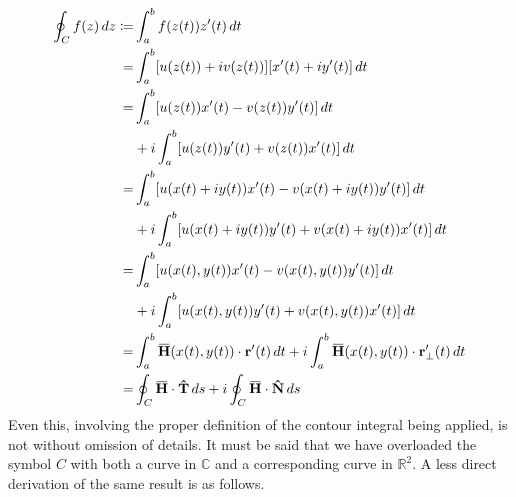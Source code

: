 \documentclass[a4paper]{article}
\newcommand*\diff{\mathop{}\!d} %
\newcommand{\R}{\mathbb{R}}
\newcommand{\C}{\mathbb{C}}
\newcommand{\overbar}[1]{\mkern 1.5mu\overline{\mkern-1.5mu#1\mkern-1.5mu}\mkern 1.5mu}
\theoremstyle{definition}
\begin{document}
\begin{align*}
    \oint_C f(z) \diff z \coloneq & \int_a^b f(z(t)) z'(t) \diff t                                                                                                                          \\
    =                             & \int_a^b [u(z(t)) + i v(z(t))] [x'(t) + i y'(t)] \diff t                                                                                                \\
    =                             & \int_a^b [u(z(t))x'(t) - v(z(t))y'(t)] \diff t                                                                                                          \\
    \phantom{=}                   & + i \int_a^b [u(z(t))y'(t) + v(z(t))x'(t)] \diff t                                                                                                      \\
    =                             & \int_a^b [u(x(t) + i y(t))x'(t) - v(x(t) + i y(t))y'(t)] \diff t                                                                                        \\
    \phantom{=}                   & + i \int_a^b [u(x(t) + i y(t))y'(t) + v(x(t) + i y(t))x'(t)] \diff t                                                                                    \\
    =                             & \int_a^b [u(x(t), y(t))x'(t) - v(x(t), y(t))y'(t)] \diff t                                                                                              \\
    \phantom{=}                   & + i \int_a^b [u(x(t), y(t))y'(t) + v(x(t), y(t))x'(t)] \diff t                                                                                          \\
    =                             & \int_a^b \mathbf{\overbar{H}}(x(t), y(t)) \cdot \mathbf{r}'(t) \diff t + i \int_a^b \mathbf{\overbar{H}}(x(t), y(t)) \cdot \mathbf{r}_\perp'(t) \diff t \\
    =                             & \oint_C \mathbf{\overbar{H}} \cdot \mathbf{\hat{T}} \diff s + i \oint_C \mathbf{\overbar{H}} \cdot \mathbf{\hat{N}} \diff s
\end{align*}
Even this, involving the proper definition of the contour integral being applied, is not without omission of details.
It must be said that we have overloaded the symbol $C$ with both a curve in $\C$ and a corresponding curve in $\R^2$.
A less direct derivation of the same result is as follows.
\end{document}
